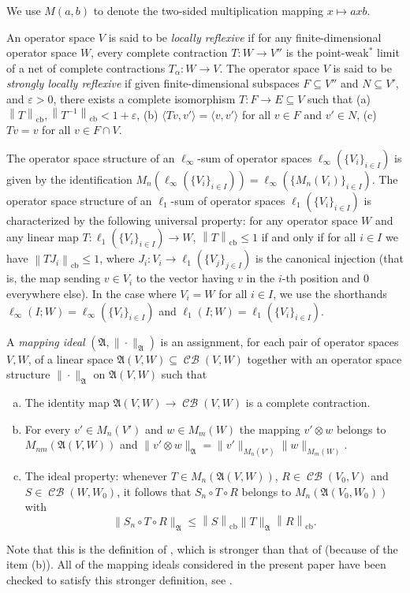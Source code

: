 \documentclass[11pt]{amsart}
\DeclareMathOperator{\cb}{cb}
\DeclareMathOperator{\CB}{\mathcal{CB}}
\newcommand{\n}[1]{ \left\|#1\right\| }
\newcommand{\pair}[2]{{\langle #1, #2 \rangle}}
\numberwithin{equation}{section}
\begin{document}
We use $M(a,b)$ to denote the two-sided multiplication mapping $x \mapsto axb$.

An operator space $V$ is said to be \emph{locally reflexive} if for any finite-dimensional operator space $W$, every complete contraction $T : W \to V''$ is the point-weak$^*$ limit of a net of complete contractions $T_\alpha : W \to V$.
The operator space $V$ is said to be \emph{strongly locally reflexive} if given finite-dimensional subspaces $F\subseteq V''$ and $N \subseteq V'$, and $\varepsilon>0$, there exists a complete isomorphism $T : F \to E \subseteq V$ such that
(a) $\n{T}_{\cb},\n{T^{-1}}_{\cb} < 1+\varepsilon$,
(b) $\pair{Tv}{v'} = \pair{v}{v'}$ for all $v \in F$ and $v' \in N$,
(c) $Tv=v$ for all $v\in F \cap V$.

The operator space structure of an $\ell_\infty$-sum of operator spaces $\ell_\infty(\{V_i\}_{i \in  I})$ is given by the identification $M_n(\ell_\infty(\{V_i\}_{i \in  I})) = \ell_\infty(\{M_n(V_i)\}_{i \in  I})$.
The operator space structure of an $\ell_1$-sum of operator spaces $\ell_1(\{V_i\}_{i \in  I})$ is characterized by the following universal property: for any operator space $W$ and any linear map $T : \ell_1(\{V_i\}_{i \in  I}) \to W$, $\n{T}_{\cb} \le 1$ if and only if for all $i\in I$ we have $\n{TJ_i}_{\cb} \le 1$, where $J_i : V_i \to \ell_1(\{V_j\}_{j \in  I})$ is the canonical injection (that is, the map sending $v \in V_i$ to the vector having $v$ in the $i$-th position and 0 everywhere else).
In the case where $V_i = W$ for all $i\in I$, we use the shorthands
$\ell_\infty(I ; W) = \ell_\infty(\{V_i\}_{i \in  I})$ and
$\ell_1(I ; W) = \ell_1(\{V_i\}_{i \in  I})$.


A \emph{mapping ideal} $(\mathfrak{A},\|\cdot\|_{\mathfrak{A}})$ is an assignment, for each pair of operator spaces $V,W$, of a linear space $\mathfrak{A}(V,W) \subseteq \CB(V,W)$  together with an operator space structure $\|\cdot\|_{\mathfrak{A}}$ on $\mathfrak{A}(V,W)$ such that
\begin{enumerate}[(a)]
\item The identity map $\mathfrak{A}(V,W) \to \CB(V,W)$ is a complete contraction.
\item For every $v'\in M_n(V')$ and $w\in M_m(W)$ the mapping $v'\otimes w$ belongs to $M_{nm}(\mathfrak{A}(V,W))$ and $\|v'\otimes w\|_{\mathfrak{A}}=\|v'\|_{M_n(V')} \|w\|_{M_m(W)}$.
\item The ideal property: whenever $T \in M_n(\mathfrak{A}(V,W))$, $R \in \CB(V_0,V)$ and $S \in \CB(W,W_0)$, it follows that $S_n \circ T \circ R$ belongs to $ M_n(\mathfrak{A}(V_0,W_0))$ with
$$
\| S_n \circ T \circ R \|_{\mathfrak{A}} \le \n{S}_{\cb} \|T\|_{\mathfrak{A}} \n{R}_{\cb}.
$$
\end{enumerate}
Note that this is the definition of \cite[Def. 7.1]{ChaDiGa-tensor-norms}, which is stronger than that of \cite[Sec. 12.2]{Effros-Ruan-book} (because of the item (b)).
All of the mapping ideals considered in the present paper have been checked to satisfy this stronger definition, see \cite[Sec. 7]{ChaDiGa-tensor-norms}.
\end{document}
